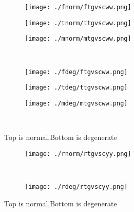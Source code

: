 \documentclass[aps,floats,floatfix,nofootinbib]{revtex4-1}
\begin{document}
\begin{center}
\begin{figure}
\begin{subfigure}{0.3\textwidth}
\texttt{[image: ./fnorm/ftgvscww.png]}
\label{}
\end{subfigure}
\begin{subfigure}{0.3\textwidth}
\texttt{[image: ./tnorm/ttgvscww.png]}
\label{}
\end{subfigure}
\begin{subfigure}{0.3\textwidth}
\texttt{[image: ./mnorm/mtgvscww.png]}
\label{}
\end{subfigure}\\
\begin{subfigure}{0.3\textwidth}
\texttt{[image: ./fdeg/ftgvscww.png]}
\label{}
\end{subfigure}
\begin{subfigure}{0.3\textwidth}
\texttt{[image: ./tdeg/ttgvscww.png]}
\label{}
\end{subfigure}
\begin{subfigure}{0.3\textwidth}
\texttt{[image: ./mdeg/mtgvscww.png]}
\label{}
\end{subfigure}\\
\caption{Top is normal,Bottom is degenerate}
\end{figure}
\end{center}

\begin{center}
\begin{figure}
\begin{subfigure}{0.95\textwidth}
\texttt{[image: ./rnorm/rtgvscyy.png]}
\label{}
\end{subfigure}\\
\begin{subfigure}{0.95\textwidth}
\texttt{[image: ./rdeg/rtgvscyy.png]}
\label{}
\end{subfigure}
\caption{Top is normal,Bottom is degenerate}
\end{figure}
\end{center}
\end{document}
